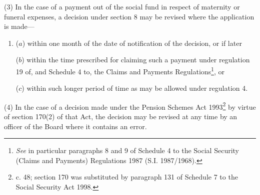 \documentclass[12pt,a4paper]{article}
\begin{document}
(3) In the case of a payment out of the social fund in respect of maternity or funeral expenses, a decision under section 8 may be revised where the application is made—
\begin{enumerate}\item[]
($a$) within one month of the date of notification of the decision, or if later

($b$) within the time prescribed for claiming such a payment under regulation 19 of, and Schedule 4 to, the Claims and Payments Regulations\footnote{\frenchspacing \emph{See} in particular paragraphs 8 and 9 of Schedule 4 to the Social Security (Claims and Payments) Regulations 1987 (S.I. 1987/1968).}, or

($c$) within such longer period of time as may be allowed under regulation 4.
\end{enumerate}

(4) In the case of a decision made under the Pension Schemes Act 1993\footnote{ c. 48; section 170 was substituted by paragraph 131 of Schedule 7 to the Social Security Act 1998.} by virtue of section 170(2) of that Act, the decision may be revised at any time by 
an officer of the Board  %
where it contains an error.
\end{document}
